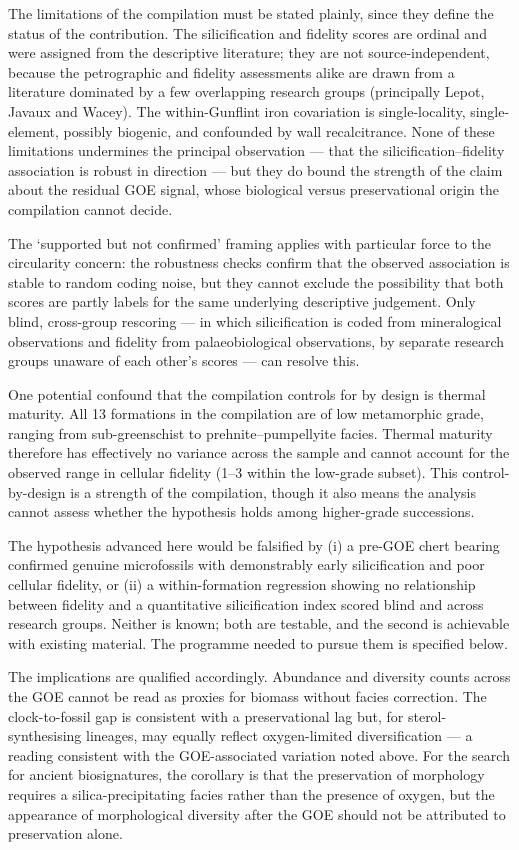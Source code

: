 \documentclass[11pt]{article}
\begin{document}
The limitations of the compilation must be stated plainly, since they define the status of the
contribution. The silicification and fidelity scores are ordinal and were assigned from the
descriptive literature; they are not source-independent, because the petrographic and fidelity
assessments alike are drawn from a literature dominated by a few overlapping research groups
(principally Lepot, Javaux and Wacey). The within-Gunflint iron covariation is single-locality,
single-element, possibly biogenic, and confounded by wall recalcitrance. None of these limitations
undermines the principal observation --- that the silicification--fidelity association is robust in
direction --- but they do bound the strength of the claim about the residual GOE signal, whose
biological versus preservational origin the compilation cannot decide.

The `supported but not confirmed' framing applies with particular force to the circularity concern:
the robustness checks confirm that the observed association is stable to random coding noise, but
they cannot exclude the possibility that both scores are partly labels for the same underlying
descriptive judgement. Only blind, cross-group rescoring --- in which silicification is coded from
mineralogical observations and fidelity from palaeobiological observations, by separate research
groups unaware of each other's scores --- can resolve this.

One potential confound that the compilation controls for by design is thermal maturity. All 13
formations in the compilation are of low metamorphic grade, ranging from sub-greenschist to
prehnite--pumpellyite facies. Thermal maturity therefore has effectively no variance across the
sample and cannot account for the observed range in cellular fidelity (1--3 within the low-grade
subset). This control-by-design is a strength of the compilation, though it also means the analysis
cannot assess whether the hypothesis holds among higher-grade successions.

The hypothesis advanced here would be falsified by (i) a pre-GOE chert bearing confirmed genuine
microfossils with demonstrably early silicification and poor cellular fidelity, or (ii) a
within-formation regression showing no relationship between fidelity and a quantitative
silicification index scored blind and across research groups. Neither is known; both are testable,
and the second is achievable with existing material. The programme needed to pursue them is
specified below.

The implications are qualified accordingly. Abundance and diversity counts across the GOE cannot be
read as proxies for biomass without facies correction. The clock-to-fossil gap is consistent with a
preservational lag but, for sterol-synthesising lineages, may equally reflect oxygen-limited
diversification --- a reading consistent with the GOE-associated variation noted above. For the
search for ancient biosignatures, the corollary is
that the preservation of morphology requires a silica-precipitating facies rather than the presence
of oxygen, but the appearance of morphological diversity after the GOE should not be attributed to
preservation alone.
\end{document}
